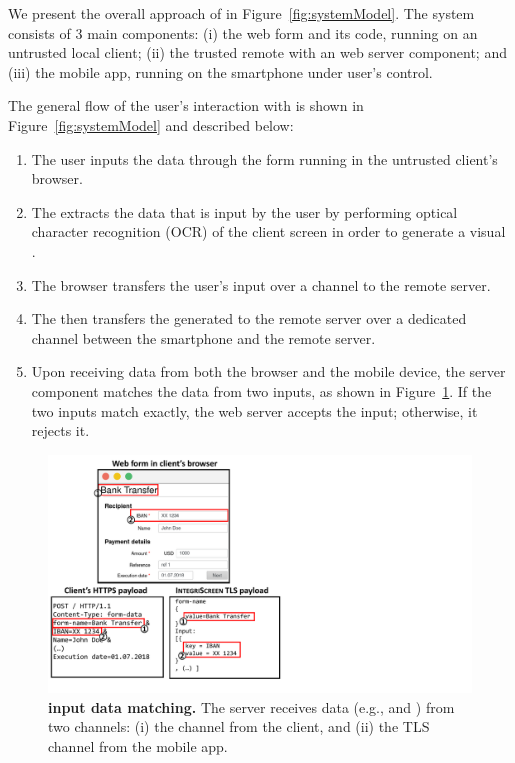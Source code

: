 We present the overall approach of \sysname in Figure~\ref{fig:systemModel}.
The system consists of 3 main components: (i) the web form and its code, running on an untrusted local client; (ii) the trusted remote \server with an \name web server component; and (iii) the mobile app, running on the smartphone under user's control.

The general flow of the user's interaction with \sysname is shown in Figure~\ref{fig:systemModel} and described below:
\begin{enumerate} %
  \item[\one] The user inputs the data through the form running in the untrusted client's browser.

  \item[\two] The \app extracts the data that is input by the user by performing optical character recognition (OCR) of the client screen in order to generate a visual \POI.

  \item[\three] The browser transfers the user's input over a \https channel to the remote server.

  \item[\four] The \app then transfers the generated \POI to the remote server over a dedicated \tls channel between the smartphone and the remote server.

  \item[\five] Upon receiving data from both the browser and the mobile device, the \name server component matches the data from two inputs, as shown in Figure~\ref{fig:traceMatching}.
  If the two inputs match exactly, the web server accepts the input; otherwise, it rejects it.
\end{enumerate}



\begin{figure}[t]
    \centering
    \includegraphics[trim={0 1cm 15cm 0},clip,width=0.9\linewidth]{img/inputMatching.pdf}
\caption{\textbf{\name input data matching.}
        The server receives data (e.g., \one and \two) from two channels: (i) the \https channel from the client, and (ii) the TLS channel from the \name mobile app.}
    \label{fig:traceMatching}
    \vspace{0.3cm}
\end{figure}




